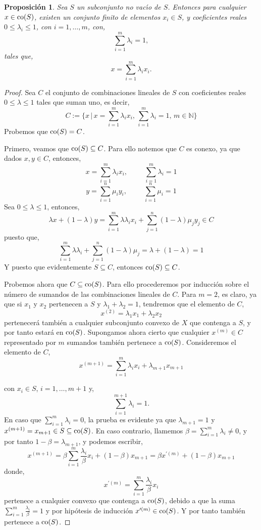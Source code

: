 \documentclass[12pt]{book}
\newtheorem{prop}{\bf Proposición}[chapter]
\begin{document}
\begin{prop} Sea $S$ un subconjunto no vac\'{\i}o de $S$. Entonces para cualquier  $x\in {\rm co}
(S)$, existen un conjunto finito de elementos $x_i\in S$,  y coeficientes reales $0\leq \lambda_i\leq 
1$, con $i =1,\dots,m$, con,
$$\sum_{i =1}^m \lambda_i =1,$$
tales que,
$$ x=\sum_{i=1}^m \lambda_i x_i.$$ 
\end{prop}
\begin{proof}
Sea $C$ el conjunto de combinaciones lineales de $S$ con coeficientes reales  
$0\leq\lambda\leq1$ tales que suman uno, es decir,
$$C:=\{ x \,|\, x=\sum_{i=1}^m \lambda_i x_i,\, \sum_{i=1}^m \lambda_i = 1,\, m\in\mathbb{N}\}$$
Probemos que ${\rm co}(S)=C$.


Primero, veamos que ${\rm co}(S)\subseteq C$. Para ello notemos que $C$ es conexo, ya que 
dados $x,y\in C$, entonces,
$$ x=\sum_{i=1}^m \lambda_i x_i,\hspace{1cm} \sum_{i=1}^m\lambda_i=1$$
$$ y=\sum_{i=1}^n \mu_i y_i,\hspace{1cm} \sum_{i=1}^n\mu_i=1$$
Sea $0\leq\lambda\leq1$, entonces,
$$\lambda x + (1-\lambda)y =\sum_{i=1}^m \lambda\lambda_i x_i + \sum_{j=1}^n(1-\lambda)\mu_j 
y_j\in C$$
puesto que,
$$\sum_{i=1}^m\lambda\lambda_i + \sum_{j=1}^n  (1-\lambda)\mu_j=\lambda + (1-\lambda)=1$$
Y puesto que evidentemente $S\subseteq C$, entonces ${\rm co}(S)\subseteq C$.


Probemos ahora que $C\subseteq {\rm co}(S)$. Para ello procederemos por inducci\'on  sobre el 
n\'umero de sumandos de las combinaciones lineales de $C$. Para $m=2$, es claro, ya que si 
$x_1$ y $x_2$  pertenecen a $S$ y $\lambda_1+\lambda_2=1$, tendremos que  el elemento de 
$C$,
$$x^{(2)}=\lambda_1x_1+\lambda_2x_2$$
pertenecer\'a tambi\'en a cualquier subconjunto convexo  de $X$ que contenga a $S$, y por tanto 
estar\'a en ${\rm co}(S)$.
  Supongamos ahora cierto que cualquier  $x^{(m)}\in  C$ representado por $m$ sumandos 
tambi\'en  pertenece  a ${\rm co}(S)$. Consideremos el elemento de $C$,
 $$x^{(m+1)}=\sum_{i=1}^m \lambda_i x_i + \lambda_{m+1} x_{m+1}$$
 
 con $x_i\in S$, $i=1,\dots,m+1$ y,
 $$\sum_{i=1}^{m+1} \lambda_i=1.$$
 En caso que $\sum_{i=1}^m \lambda_i=0$, la prueba es evidente ya que $\lambda_{m+1}=1$ y 
$x^{(m+1)}=x_{m+1}\in S\subseteq {\rm co}(S)$. En caso contrario, llamemos $\beta=\sum_{i=1}
^{m}\lambda_i\not=0$, y por tanto $1-\beta=\lambda_{m+1}$, y podemos escribir,
$$ x^{(m+1)} = \beta\sum_{i=1}^m\frac{\lambda_i}{\beta} x_i  +(1- \beta)  x_{m+1} = \beta 
x^{\prime(m)}  +(1-\beta)x_{m+1}$$ 
donde,
 $$x^{\prime(m)}=\sum_{i=1}^m\frac{\lambda_i}{\beta} x_i$$
pertenece a cualquier convexo que contenga a ${\rm co}(S)$, debido a que la suma $\sum_{i=1}
^m\frac{\lambda_i}{\beta}=1$ y por hip\'otesis de inducci\'on  $x^{\prime(m)}\in {\rm co}(S)$. Y por 
tanto tambi\'en pertenece a $ {\rm co}(S)$.
\end{proof}
\end{document}
